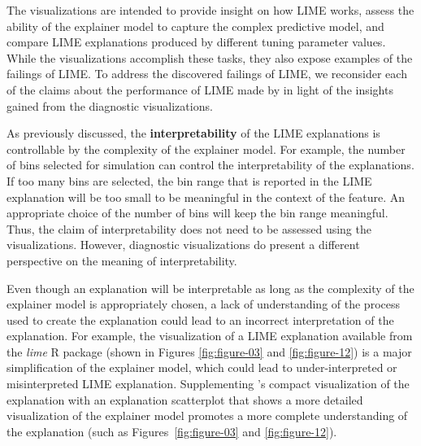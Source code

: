 \documentclass[AMS,STIX2COL]{WileyNJD-v2}\usepackage[]{graphicx}\usepackage[]{color}
\begin{document}
The visualizations are intended to provide insight on how LIME works, assess the ability of the explainer model to capture the complex predictive model, and compare LIME explanations produced by different tuning parameter values. While the visualizations accomplish these tasks, they also expose examples of the failings of LIME. To address the discovered failings of LIME, we reconsider each of the claims about the performance of LIME made by \citet{ribeiro:2016} in light of the insights gained from the diagnostic visualizations.

As previously discussed, the \textbf{interpretability} of the LIME explanations is controllable  by the complexity of the explainer model. For example, the number of bins selected for simulation can control the interpretability of the explanations. If too many bins are selected, the bin range that is reported in the LIME explanation will be too small to be meaningful in the context of the feature. An appropriate choice of the number of bins will keep the bin range meaningful. Thus, the claim of interpretability does not need to be assessed using the visualizations. However, diagnostic visualizations do present a different perspective on the meaning of interpretability.

Even though an explanation will be interpretable as long as the complexity of the explainer model is appropriately chosen, a lack of understanding of the process used to create the explanation could lead to an incorrect interpretation of the explanation. For example, the visualization of a LIME explanation available from the \emph{lime} R package \citep{pedersen:2020} (shown in Figures \ref{fig:figure-03} and \ref{fig:figure-12}) is a major simplification of the explainer model, which could lead to under-interpreted or misinterpreted LIME explanation. Supplementing \citet{pedersen:2020}'s compact visualization of the explanation with an explanation scatterplot that shows a more detailed visualization of the explainer model promotes a more complete understanding of the explanation (such as Figures~\ref{fig:figure-03} and \ref{fig:figure-12}).
\end{document}
